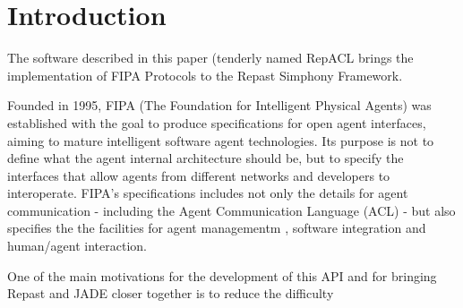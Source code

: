 \section{Introduction} %
\label{sec:introduction}


The software described in this paper (tenderly named RepACL brings the implementation of FIPA Protocols to the Repast Simphony Framework.

Founded in 1995, FIPA (The Foundation for Intelligent Physical Agents) was established with the goal to produce specifications for open agent interfaces, aiming to mature intelligent software agent technologies. Its purpose is not to define what the agent internal architecture should be, but to specify the interfaces that allow agents from different networks and developers to interoperate. FIPA's specifications includes not only the details for agent communication - including the Agent Communication Language (ACL) - but also specifies the the facilities for agent managementm , software integration and human/agent interaction.
\cite{o1998fipa}




One of the main motivations for the development of this API and for bringing Repast and JADE closer together is to reduce the difficulty 

